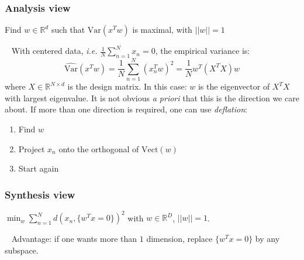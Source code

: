 \documentclass[12pt,a4paper]{report}
\begin{document}
\subsubsection{Analysis view}
\begin{center}
Find $w \in \mathbb{R}^d$ such that $\mathrm{Var}(x^{T}w)$ is maximal, with $|| w || =1$
\end{center}
~\newline
With centered data, \textit{i.e.} $\frac{1}{N}\displaystyle \sum_{n=1}^{N} x_n =0$, the empirical variance is:
\begin{equation*}
\hat{\mathrm{Var}}(x^{T}w) = \frac{1}{N}\sum_{n=1}^{N}(x_n^{T}w)^2 = \frac{1}{N}w^{T}(X^{T}X)w
\end{equation*}
where $X \in \mathbb{R}^{N\times d}$ is the design matrix.
In this case: $w$ is the eigenvector of $X^{T}X$ with largest eigenvalue. It is not obvious \textit{a priori} that this is the direction we care about.
\newline
If more than one direction is required, one can use \textit{deflation}:
\begin{enumerate}
\item Find $w$
\item Project $x_n$ onto the orthogonal of $\mathrm{Vect}(w)$
\item Start again
\end{enumerate}
\subsubsection{Synthesis view}
\begin{center}
$\displaystyle \min_{w} \sum_{n=1}^{N} d(x_n,\{ w^{T}x=0 \})^{2}$ with $w \in \mathbb{R}^{D}$, $||w||=1$.
\end{center}
~\newline
Advantage: if one wants more than $1$ dimension, replace $\{ w^{T}x=0 \}$ by any subspace.
\end{document}

